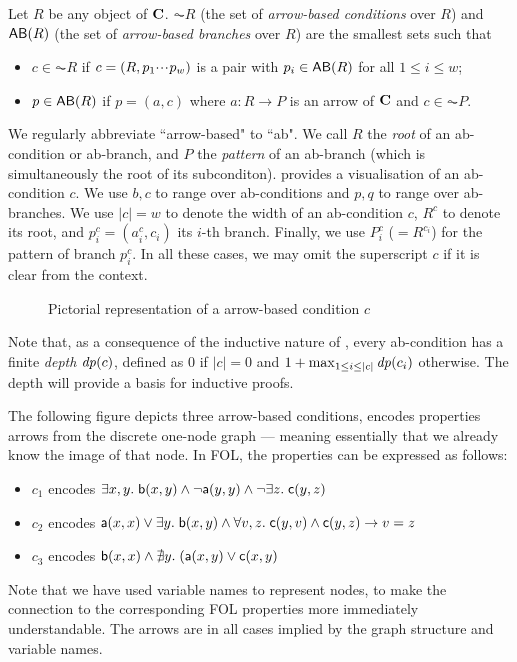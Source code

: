 \begin{definition}
  Let $R$ be any object of $\mathbf{C}$. $\AC R$ (the set of \emph{arrow-based conditions} over $R$) and $\AB R$ (the set of \emph{arrow-based branches} over $R$) are the smallest sets such that
  \begin{itemize}
  \item $c\in \AC R$ if $c=(R,p_1{\cdotp\mkern-2mu\cdotp\mkern-2mu\cdotp\mkern1mu} p_w)$ is a pair with $p_i\in \AB R$ for all $1\leq i\leq w$;
  \item $p\in \AB R$ if $p=(a,c)$ where $a: R\to P$ is an arrow of $\mathbf{C}$ and $c\in \AC P$.
  \end{itemize}
\end{definition}
%
We regularly abbreviate ``arrow-based" to ``ab". We call $R$ the \emph{root} of an ab-condition or ab-branch, and $P$ the \emph{pattern} of an ab-branch (which is simultaneously the root of its subconditon).  provides a visualisation of an ab-condition $c$. We use $b,c$ to range over ab-conditions and $p,q$ to range over ab-branches. We use $|c|=w$ to denote the width of an ab-condition $c$, $R^c$ to denote its root, and $p^c_i=(a^c_i,c_i)$ its $i$-th branch. Finally, we use $P^c_i$ ($=R^{c_i}$) for the pattern of branch $p^c_i$. In all these cases, we may omit the superscript $c$ if it is clear from the context.
%
\begin{figure}
  \centering
  
  \caption{Pictorial representation of a arrow-based condition $c$}
\end{figure}

Note that, as a consequence of the inductive nature of , every ab-condition has a finite \emph{depth} $\mathit{dp}(c)$, defined as $0$ if $|c|=0$ and $1+\max_{1\leq i\leq |c|} \mathit{dp}(c_i)$ otherwise. The depth will provide a basis for inductive proofs.

\begin{example}
The following figure depicts three arrow-based conditions, encodes properties arrows from the discrete one-node graph --- meaning essentially that we already know the image of that node. In FOL, the properties can be expressed as follows:
\begin{itemize}
\item $c_1$ encodes $\exists x,y.\; \mathsf{b}(x,y) \wedge \neg \mathsf{a}(y,y)\wedge \neg \exists z.\; \mathsf{c}(y,z)$
\item $c_2$ encodes $\mathsf{a}(x,x)\vee \exists y.\; \mathsf{b}(x,y) \wedge \forall v,z.\; \mathsf{c}(y,v)\wedge \mathsf{c}(y,z) \rightarrow v=z$
\item $c_3$ encodes $\mathsf{b}(x,x)\wedge \nexists y.\;(\mathsf{a}(x,y)\vee \mathsf{c}(x,y)$
\end{itemize}
\begin{center}

\end{center}
Note that we have used variable names to represent nodes, to make the connection to the corresponding FOL properties more immediately understandable. The arrows are in all cases implied by the graph structure and variable names.
\end{example}

